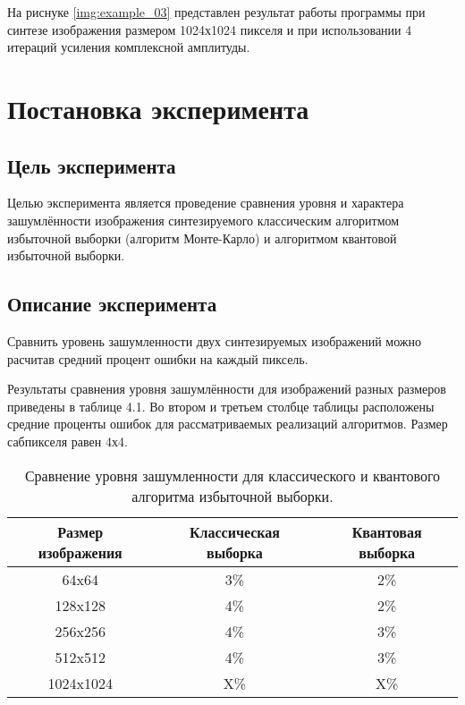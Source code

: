 На риснуке \ref{img:example_03} представлен результат работы программы при синтезе изображения размером 1024х1024 пикселя и при использовании 4 итераций усиления комплексной амплитуды.

\section{Постановка эксперимента} 

\subsection{Цель эксперимента}

Целью эксперимента является проведение сравнения уровня и характера зашумлённости изображения синтезируемого классическим алгоритмом избыточной выборки (алгоритм Монте-Карло) и алгоритмом квантовой избыточной выборки.

\subsection{Описание эксперимента}

Сравнить уровень зашумленности двух синтезируемых изображений можно расчитав средний процент ошибки на каждый пиксель.

Результаты сравнения уровня зашумлённости для изображений разных размеров приведены в таблице 4.1. Во втором и третьем столбце таблицы расположены средние проценты ошибок для рассматриваемых реализаций алгоритмов. Размер сабпикселя равен 4х4.

\begin{table}[h!]
	\label{tab:noise}
	\caption{Сравнение уровня зашумленности для классического и квантового алгоритма избыточной выборки.}
	\begin{center}
		\begin{tabular}{|c | c | c|} 
			\hline
			Размер изображения & Классическая выборка & Квантовая выборка \\  
			\hline
			64x64 & 3\% & 2\%  \\
			\hline
			128x128 & 4\% & 2\% \\
			\hline
			256x256 & 4\% & 3\% \\
			\hline
			512x512 & 4\% & 3\% \\
			\hline
			1024x1024 & X\%  & X\% \\
			\hline
		\end{tabular}
	\end{center}
\end{table}

